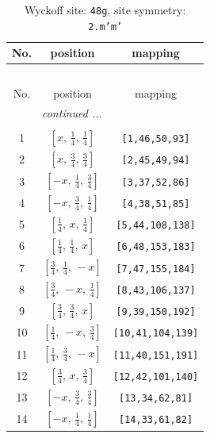 \documentclass[fleqn,8pt]{jsarticle}
\begin{document}
\begin{longtable}{ccc}
\caption{Wyckoff site: {\tt 48g}, site symmetry: {\tt 2.m'm'}}
 \\
 \hline \hline
No. & position & mapping \\ \hline \endfirsthead

\multicolumn{2}{l}{\tablename\ \thetable{}} \\
 \hline \hline
No. & position & mapping \\ \hline \endhead

 \hline \hline
\multicolumn{2}{r}{\footnotesize\it continued ...} \\ \endfoot

 \hline \hline
\multicolumn{2}{r}{} \\ \endlastfoot

1 & $\left[ x,\, \frac{1}{4},\, \frac{1}{4} \right]$ & {\tt [1,46,50,93]} \\ \hline
2 & $\left[ x,\, \frac{3}{4},\, \frac{3}{4} \right]$ & {\tt [2,45,49,94]} \\ \hline
3 & $\left[ - x,\, \frac{1}{4},\, \frac{3}{4} \right]$ & {\tt [3,37,52,86]} \\ \hline
4 & $\left[ - x,\, \frac{3}{4},\, \frac{1}{4} \right]$ & {\tt [4,38,51,85]} \\ \hline
5 & $\left[ \frac{1}{4},\, x,\, \frac{1}{4} \right]$ & {\tt [5,44,108,138]} \\ \hline
6 & $\left[ \frac{1}{4},\, \frac{1}{4},\, x \right]$ & {\tt [6,48,153,183]} \\ \hline
7 & $\left[ \frac{3}{4},\, \frac{1}{4},\, - x \right]$ & {\tt [7,47,155,184]} \\ \hline
8 & $\left[ \frac{3}{4},\, - x,\, \frac{1}{4} \right]$ & {\tt [8,43,106,137]} \\ \hline
9 & $\left[ \frac{3}{4},\, \frac{3}{4},\, x \right]$ & {\tt [9,39,150,192]} \\ \hline
10 & $\left[ \frac{1}{4},\, - x,\, \frac{3}{4} \right]$ & {\tt [10,41,104,139]} \\ \hline
11 & $\left[ \frac{1}{4},\, \frac{3}{4},\, - x \right]$ & {\tt [11,40,151,191]} \\ \hline
12 & $\left[ \frac{3}{4},\, x,\, \frac{3}{4} \right]$ & {\tt [12,42,101,140]} \\ \hline
13 & $\left[ - x,\, \frac{3}{4},\, \frac{3}{4} \right]$ & {\tt [13,34,62,81]} \\ \hline
14 & $\left[ - x,\, \frac{1}{4},\, \frac{1}{4} \right]$ & {\tt [14,33,61,82]} \\ \hline

\end{longtable}
\end{document}
